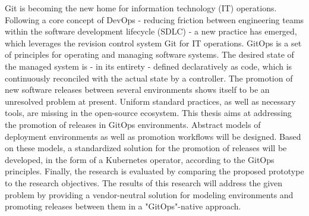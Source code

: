 
\noindent
Git is becoming the new home for information technology (IT) operations.
Following a core concept of DevOps
- reducing friction between engineering teams within the software development lifecycle (SDLC) -
a new practice has emerged,
which leverages the revision control system Git for IT operations.
GitOps is a set of principles for operating and managing software systems.
The desired state of the managed system is
- in its entirety -
defined declaratively as code,
which is continuously reconciled with the actual state by a controller.
The promotion of new software releases between several environments
shows itself to be an unresolved problem at present.
Uniform standard practices, as well as necessary tools, are missing in the open-source ecosystem.
This thesis aims at addressing
the promotion of releases in GitOps environments.
Abstract models of deployment environments as well as promotion workflows
will be designed.
Based on these models,
a standardized solution for the promotion of releases
will be developed,
in the form of a Kubernetes operator,
according to the GitOps principles.
Finally, the research is evaluated by comparing the proposed prototype
to the research objectives.
The results of this research will
address the given problem
by providing a vendor-neutral solution
for modeling environments and promoting releases between them
in a "GitOps"-native approach.






